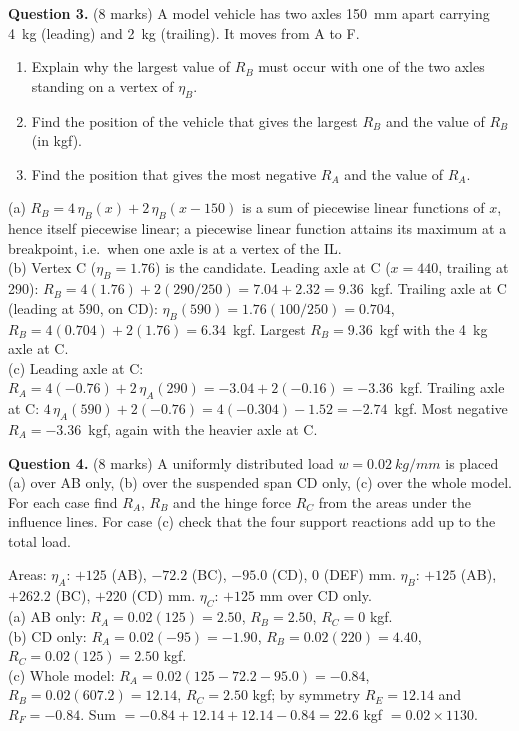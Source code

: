 \documentclass[11pt,a4paper]{article}
\newcommand{\il}[1]{\eta_{#1}}
\newif\ifkey \keyfalse \ifdefined\showkey\keytrue\fi
\newcommand{\qmarks}[1]{ {\small(#1 marks)}}
\newcommand{\workspace}[1]{\ifkey\else\vspace{#1}\fi}
\begin{document}
\textbf{Question 3.}\qmarks{8} A model vehicle has two axles \SI{150}{mm} apart carrying \SI{4}{kg} (leading) and \SI{2}{kg} (trailing). It moves from A to F.
\begin{enumerate}[label=(\alph*)]
  \item Explain why the largest value of $R_B$ must occur with one of the two axles standing on a vertex of $\il{B}$.
  \item Find the position of the vehicle that gives the largest $R_B$ and the value of $R_B$ (in kgf).
  \item Find the position that gives the most negative $R_A$ and the value of $R_A$.
\end{enumerate}
\workspace{4.5cm}
\begin{answer}
(a) $R_B = 4\,\il{B}(x) + 2\,\il{B}(x-150)$ is a sum of piecewise linear functions of $x$, hence itself piecewise linear; a piecewise linear function attains its maximum at a breakpoint, i.e.\ when one axle is at a vertex of the IL.\\
(b) Vertex C ($\il{B} = 1.76$) is the candidate. Leading axle at C ($x = 440$, trailing at 290): $R_B = 4(1.76) + 2(290/250) = 7.04 + 2.32 = 9.36$~kgf. Trailing axle at C (leading at 590, on CD): $\il{B}(590) = 1.76(100/250) = 0.704$, $R_B = 4(0.704) + 2(1.76) = 6.34$~kgf. Largest $R_B = 9.36$~kgf with the \SI{4}{kg} axle at C.\\
(c) Leading axle at C: $R_A = 4(-0.76) + 2\,\il{A}(290) = -3.04 + 2(-0.16) = -3.36$~kgf. Trailing axle at C: $4\,\il{A}(590) + 2(-0.76) = 4(-0.304) - 1.52 = -2.74$~kgf. Most negative $R_A = -3.36$~kgf, again with the heavier axle at C.
\end{answer}

\textbf{Question 4.}\qmarks{8} A uniformly distributed load $w = \SI{0.02}{kg/mm}$ is placed (a) over AB only, (b) over the suspended span CD only, (c) over the whole model. For each case find $R_A$, $R_B$ and the hinge force $R_C$ from the areas under the influence lines. For case (c) check that the four support reactions add up to the total load.
\workspace{5cm}
\begin{answer}
Areas: $\il{A}$: $+125$ (AB), $-72.2$ (BC), $-95.0$ (CD), 0 (DEF) mm. $\il{B}$: $+125$ (AB), $+262.2$ (BC), $+220$ (CD) mm. $\il{C}$: $+125$ mm over CD only.\\
(a) AB only: $R_A = 0.02(125) = 2.50$, $R_B = 2.50$, $R_C = 0$ kgf.\\
(b) CD only: $R_A = 0.02(-95) = -1.90$, $R_B = 0.02(220) = 4.40$, $R_C = 0.02(125) = 2.50$ kgf.\\
(c) Whole model: $R_A = 0.02(125 - 72.2 - 95.0) = -0.84$, $R_B = 0.02(607.2) = 12.14$, $R_C = 2.50$ kgf; by symmetry $R_E = 12.14$ and $R_F = -0.84$. Sum $= -0.84 + 12.14 + 12.14 - 0.84 = 22.6$ kgf $= 0.02 \times 1130$. \checkmark
\end{answer}
\end{document}
